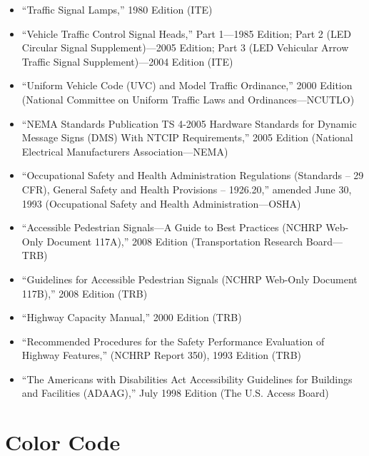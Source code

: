 \documentclass[9pt]{memoir}
\begin{document}
{\begin{itemize}
\item    ``Traffic Signal Lamps,'' 1980 Edition (ITE)
\item    ``Vehicle Traffic Control Signal Heads,'' Part 1---1985 Edition; Part 2 (LED Circular Signal Supplement)---2005 Edition; Part 3 (LED Vehicular Arrow Traffic Signal Supplement)---2004 Edition (ITE)
\item    ``Uniform Vehicle Code (UVC) and Model Traffic Ordinance,'' 2000 Edition (National Committee on Uniform Traffic Laws and Ordinances---NCUTLO)
\item    ``NEMA Standards Publication TS 4-2005 Hardware Standards for Dynamic Message Signs (DMS) With NTCIP Requirements,'' 2005 Edition (National Electrical Manufacturers Association---NEMA)
\item    ``Occupational Safety and Health Administration Regulations (Standards -- 29 CFR), General Safety and Health Provisions -- 1926.20,'' amended June 30, 1993 (Occupational Safety and Health Administration---OSHA)
\item    ``Accessible Pedestrian Signals---A Guide to Best Practices (NCHRP Web-Only Document 117A),'' 2008 Edition (Transportation Research Board---TRB)
\item    ``Guidelines for Accessible Pedestrian Signals (NCHRP Web-Only Document 117B),'' 2008 Edition (TRB)
\item    ``Highway Capacity Manual,'' 2000 Edition (TRB)
\item    ``Recommended Procedures for the Safety Performance Evaluation of Highway Features,'' (NCHRP Report 350), 1993 Edition (TRB)
\item    ``The Americans with Disabilities Act Accessibility Guidelines for Buildings and Facilities (ADAAG),'' July 1998 Edition (The U.S. Access Board)
\end{itemize}}

\section{Color Code}

\end{document}
